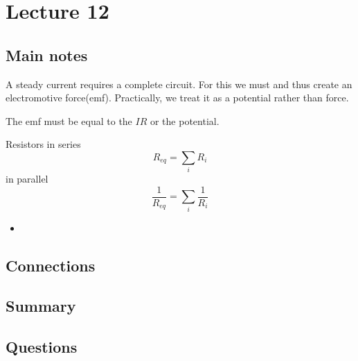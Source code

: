 \section{Lecture 12}

\subsection{Main notes}
A steady current requires a complete circuit. For this we must and thus create an electromotive force(emf). Practically, we treat it as a potential rather than force.


The emf must be equal to the $IR$ or the potential.

Resistors in series
\[
R_{eq} = \sum_i R_i
  \]
  in parallel
\[
\frac{1}{R_{eq}} = \sum_i \frac{1}{R_i} \]
\begin{itemize}
	\item
\end{itemize}


\subsection{Connections}


\subsection{Summary}


\subsection{Questions}
